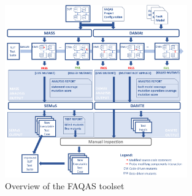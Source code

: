 %

\begin{figure}[tb]
\begin{center}
\includegraphics[width=0.7\textwidth]{images/FAQAS-overview.pdf}
\caption{Overview of the FAQAS toolset}
\label{fig:FAQAS:toolset}
\end{center}
\end{figure}


